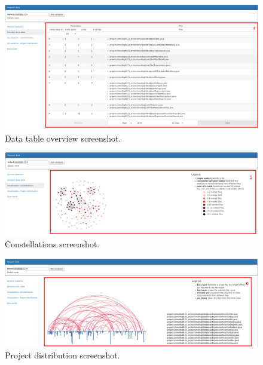 \documentclass{uva-inf-article}
\begin{document}
\begin{figure}[!htb]
	\includegraphics[width=\textwidth]{visualization2}
	\centering
	\caption{Data table overview screenshot.}
	\label{screenshot2}
\end{figure}

\begin{figure}[!htb]
	\includegraphics[width=\textwidth]{visualization3}
	\centering
	\caption{Constellations screenshot.}
	\label{screenshot3}
\end{figure}

\begin{figure}[!htb]
	\includegraphics[width=\textwidth]{visualization4}
	\centering
	\caption{Project distribution screenshot.}
	\label{screenshot4}
\end{figure}

\end{document}
